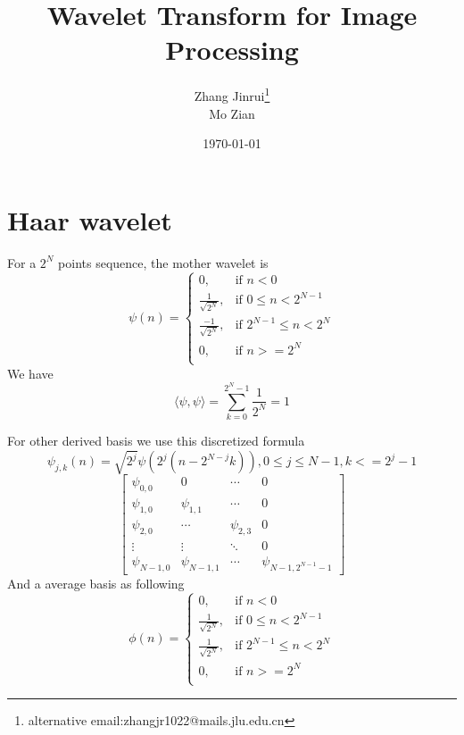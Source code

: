 \documentclass{beamer}
\title{Wavelet Transform for Image Processing}
\author{
\texorpdfstring{
Zhang Jinrui\thanks{alternative email:zhangjr1022@mails.jlu.edu.cn}
\\
Mo Zian
}
{
Zhang Jinrui\thanks{alternative email:zhangjr1022@mails.jlu.edu.cn}
,
Mo Zian
}
}
\date{\today}
\begin{document}
\frame{\titlepage}  %

\section{Haar wavelet}
\begin{frame}
    For a \(2^{N}\) points sequence, the mother
    wavelet is
    \[
        \psi(n) =
        \begin{cases}
            0,                     & \text{if } n < 0               \\
            \frac{1}{\sqrt{2^N}},  & \text{if } 0\leq n < 2^{N-1}   \\
            \frac{-1}{\sqrt{2^N}}, & \text{if } 2^{N-1}\leq n<2^{N} \\
            0,                     & \text{if } n >= 2^N            \\
        \end{cases}
    \]
    We have
    \[
        \langle\psi,\psi\rangle=\sum_{k=0}^{2^N-1}\frac{1}{2^N}=1
    \]
\end{frame}
\begin{frame}
    For other derived basis we use
    this discretized formula
    \[
        \psi_{j,k}(n)=\sqrt{2^j}\psi(2^j(n-2^{N-j}k)) , 0\leq j\leq N-1
        , k<=2^j-1
    \]
    \[
        \left[
            \begin{array}{cccc}
                \psi_{0,0}   & 0            & \cdots     & 0                    \\
                \psi_{1,0}   & \psi_{1,1}   & \cdots     & 0                    \\
                \psi_{2,0}   & \cdots       & \psi_{2,3} & 0                    \\
                \vdots       & \vdots       & \ddots     & 0                    \\
                \psi_{N-1,0} & \psi_{N-1,1} & \cdots     & \psi_{N-1,2^{N-1}-1}
            \end{array}
            \right]
    \]
    And a average basis as following
    \[
        \phi(n) =
        \begin{cases}
            0,                    & \text{if } n < 0               \\
            \frac{1}{\sqrt{2^N}}, & \text{if } 0\leq n < 2^{N-1}   \\
            \frac{1}{\sqrt{2^N}}, & \text{if } 2^{N-1}\leq n<2^{N} \\
            0,                    & \text{if } n >= 2^N            \\
        \end{cases}
    \]
\end{frame}
\end{document}
